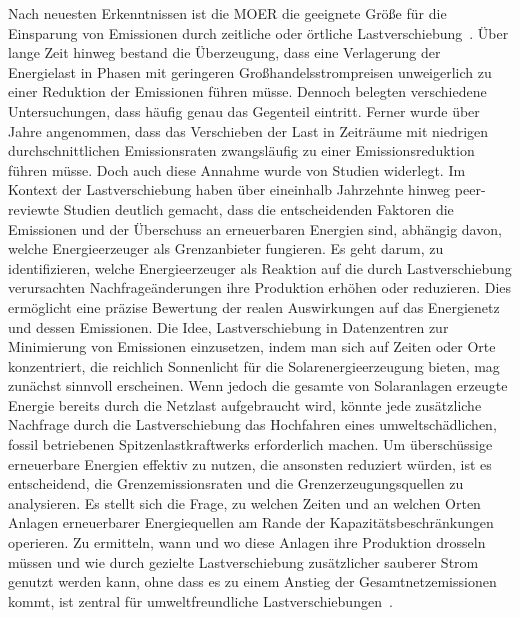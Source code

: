 Nach neuesten Erkenntnissen ist die \ac{MOER} die geeignete Größe für die Einsparung von Emissionen durch zeitliche oder örtliche Lastverschiebung~\cite{Schram.03.05.201905.05.2019}\cite{WattTime.12.3.2024}.
Über lange Zeit hinweg bestand die Überzeugung, dass eine Verlagerung der Energielast in Phasen mit geringeren Großhandelsstrompreisen unweigerlich zu einer Reduktion der Emissionen führen müsse.
Dennoch belegten verschiedene Untersuchungen, dass häufig genau das Gegenteil eintritt.
Ferner wurde über Jahre angenommen, dass das Verschieben der Last in Zeiträume mit niedrigen durchschnittlichen Emissionsraten zwangsläufig zu einer Emissionsreduktion führen müsse.
Doch auch diese Annahme wurde von Studien widerlegt.
Im Kontext der Lastverschiebung haben über eineinhalb Jahrzehnte hinweg peer-reviewte Studien deutlich gemacht, dass die entscheidenden Faktoren die Emissionen und der Überschuss an erneuerbaren Energien sind, abhängig davon, welche Energieerzeuger als Grenzanbieter fungieren.
Es geht darum, zu identifizieren, welche Energieerzeuger als Reaktion auf die durch Lastverschiebung verursachten Nachfrageänderungen ihre Produktion erhöhen oder reduzieren.
Dies ermöglicht eine präzise Bewertung der realen Auswirkungen auf das Energienetz und dessen Emissionen.
Die Idee, Lastverschiebung in Datenzentren zur Minimierung von Emissionen einzusetzen, indem man sich auf Zeiten oder Orte konzentriert, die reichlich Sonnenlicht für die Solarenergieerzeugung bieten, mag zunächst sinnvoll erscheinen.
Wenn jedoch die gesamte von Solaranlagen erzeugte Energie bereits durch die Netzlast aufgebraucht wird, könnte jede zusätzliche Nachfrage durch die Lastverschiebung das Hochfahren eines umweltschädlichen, fossil betriebenen Spitzenlastkraftwerks erforderlich machen.
Um überschüssige erneuerbare Energien effektiv zu nutzen, die ansonsten reduziert würden, ist es entscheidend, die Grenzemissionsraten und die Grenzerzeugungsquellen zu analysieren.
Es stellt sich die Frage, zu welchen Zeiten und an welchen Orten Anlagen erneuerbarer Energiequellen am Rande der Kapazitätsbeschränkungen operieren.
Zu ermitteln, wann und wo diese Anlagen ihre Produktion drosseln müssen und wie durch gezielte Lastverschiebung zusätzlicher sauberer Strom genutzt werden kann, ohne dass es zu einem Anstieg der Gesamtnetzemissionen kommt, ist zentral für umweltfreundliche Lastverschiebungen~\cite{WattTime.12.3.2024}.

